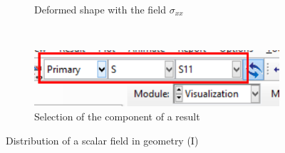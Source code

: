 \begin{enumerate}
\begin{figure}[H]
\begin{subfigure}{0.44\textwidth}
      \caption{Deformed shape with the field $\sigma_{xx}$}
      \label{figu77}
    \end{subfigure}%
    ~ %
    \begin{subfigure}{0.35\textwidth}
      \includegraphics[width=\textwidth]{./body/images/imagen78.pdf}
      \caption{Selection of the component of a result}
      \label{figu78}
    \end{subfigure}%
    \caption{Distribution of a scalar field in geometry (I)}
  \end{figure}


\end{enumerate}
